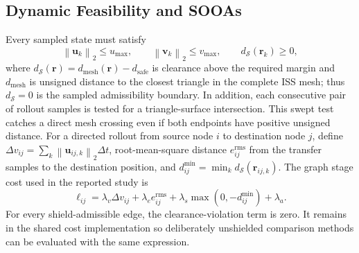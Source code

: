 \documentclass{IEEEtaes}
\newcommand{\dt}{\Delta t}
\newcommand{\norm}[1]{\left\lVert #1 \right\rVert}
\theoremstyle{remark}
\theoremstyle{plain}
\begin{document}
\subsection{Dynamic Feasibility and SOOAs}

Every sampled state must satisfy
\begin{equation}
  \norm{\mathbf u_k}_2\le u_{\max},\qquad
  \norm{\mathbf v_k}_2\le v_{\max},\qquad
  d_{\mathcal S}(\mathbf r_k)\ge 0,
  \label{eq:limits}
\end{equation}
where $d_{\mathcal S}(\mathbf r)=d_{\mathrm{mesh}}(\mathbf r)-d_{\mathrm{safe}}$ is clearance above the required margin and $d_{\mathrm{mesh}}$ is unsigned distance to the closest triangle in the complete ISS mesh; thus $d_{\mathcal S}=0$ is the sampled admissibility boundary. In addition, each consecutive pair of rollout samples is tested for a triangle-surface intersection. This swept test catches a direct mesh crossing even if both endpoints have positive unsigned distance. For a directed rollout from source node $i$ to destination node $j$, define $\Delta v_{ij}=\sum_k\norm{\mathbf u_{ij,k}}_2\dt$, root-mean-square distance $e_{ij}^{\mathrm{rms}}$ from the transfer samples to the destination position, and $d_{ij}^{\min}=\min_k d_{\mathcal S}(\mathbf r_{ij,k})$. The graph stage cost used in the reported study is
\begin{equation}
  \ell_{ij}=\lambda_v\Delta v_{ij}+\lambda_e e_{ij}^{\mathrm{rms}}+\lambda_s\max(0,-d_{ij}^{\min})+\lambda_a.
  \label{eq:edge-cost}
\end{equation}
For every shield-admissible edge, the clearance-violation term is zero. It remains in the shared cost implementation so deliberately unshielded comparison methods can be evaluated with the same expression.
\end{document}
